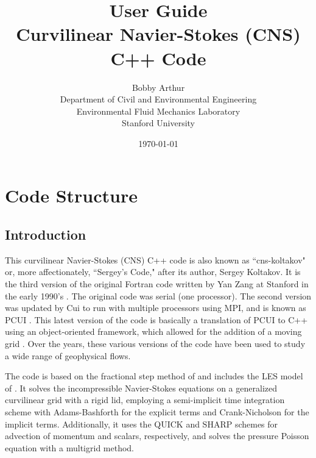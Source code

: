 \documentclass[12pt]{report}
\title{User Guide\\ \vspace{0.1in} \large{Curvilinear Navier-Stokes (CNS) C++ Code}}
\author{Bobby Arthur \\ Department of Civil and Environmental Engineering
                     \\ Environmental Fluid Mechanics Laboratory
                     \\ Stanford University}
\date{\today}
\begin{document}
\maketitle
\tableofcontents

\chapter{Code Structure}

\section{Introduction}
This curvilinear Navier-Stokes (CNS) C++ code is also known as ``cns-koltakov" or, more affectionately, ``Sergey's Code," after its author, Sergey Koltakov. It is the third version of the original Fortran code written by Yan Zang at Stanford in the early 1990's \citep{zang1994}. The original code was serial (one processor). The second version was updated by Cui to run with multiple processors using MPI, and is known as PCUI \citep{cui2001}. This latest version of the code is basically a translation of PCUI to C++ using an object-oriented framework, which allowed for the addition of a moving grid \citep{koltakov2012}. Over the years, these various versions of the code have been used to study a wide range of geophysical flows.

The code is based on the fractional step method of \citet{zang1994} and includes the LES model of \citet{zang1993}. It solves the incompressible Navier-Stokes equations on a generalized curvilinear grid with a rigid lid, employing a semi-implicit time integration scheme with Adams-Bashforth for the explicit terms and Crank-Nicholson for the implicit terms. Additionally, it uses the QUICK and SHARP schemes for advection of momentum and scalars, respectively, and solves the pressure Poisson equation with a multigrid method. 
\end{document}
